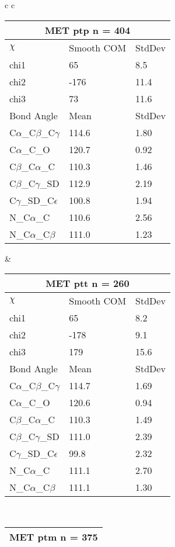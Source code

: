 \begin{longtable}{ c c }
  \begin{tabular}{ l l l }
  \toprule
  \multicolumn{3}{c}{MET \textbf{ptp} n = 404} \\ \toprule
  $\chi$       & Smooth COM & StdDev \\ \midrule
  chi1 & 65 & 8.5 \\ 
  chi2 & -176 & 11.4 \\ 
  chi3 & 73 & 11.6 \\ \midrule
  Bond Angle   & Mean     & StdDev \\ \midrule
  C$\alpha$\_C$\beta$\_C$\gamma$ & 114.6 & 1.80\\
  C$\alpha$\_C\_O & 120.7 & 0.92\\
  C$\beta$\_C$\alpha$\_C & 110.3 & 1.46\\
  C$\beta$\_C$\gamma$\_SD & 112.9 & 2.19\\
  C$\gamma$\_SD\_C$\epsilon$ & 100.8 & 1.94\\
  N\_C$\alpha$\_C & 110.6 & 2.56\\
  N\_C$\alpha$\_C$\beta$ & 111.0 & 1.23\\
  \bottomrule
  \end{tabular}
  &
  \begin{tabular}{ l l l }
  \toprule
  \multicolumn{3}{c}{MET \textbf{ptt} n = 260} \\ \toprule
  $\chi$       & Smooth COM & StdDev \\ \midrule
  chi1 & 65 & 8.2 \\ 
  chi2 & -178 & 9.1 \\ 
  chi3 & 179 & 15.6 \\ \midrule
  Bond Angle   & Mean     & StdDev \\ \midrule
  C$\alpha$\_C$\beta$\_C$\gamma$ & 114.7 & 1.69\\
  C$\alpha$\_C\_O & 120.6 & 0.94\\
  C$\beta$\_C$\alpha$\_C & 110.3 & 1.49\\
  C$\beta$\_C$\gamma$\_SD & 111.0 & 2.39\\
  C$\gamma$\_SD\_C$\epsilon$ & 99.8 & 2.32\\
  N\_C$\alpha$\_C & 111.1 & 2.70\\
  N\_C$\alpha$\_C$\beta$ & 111.1 & 1.30\\
  \bottomrule
  \end{tabular}
  \\
  \begin{tabular}{ l l l }
  \toprule
  \multicolumn{3}{c}{MET \textbf{ptm} n = 375} \\ \toprule

\end{tabular}
\end{longtable}
